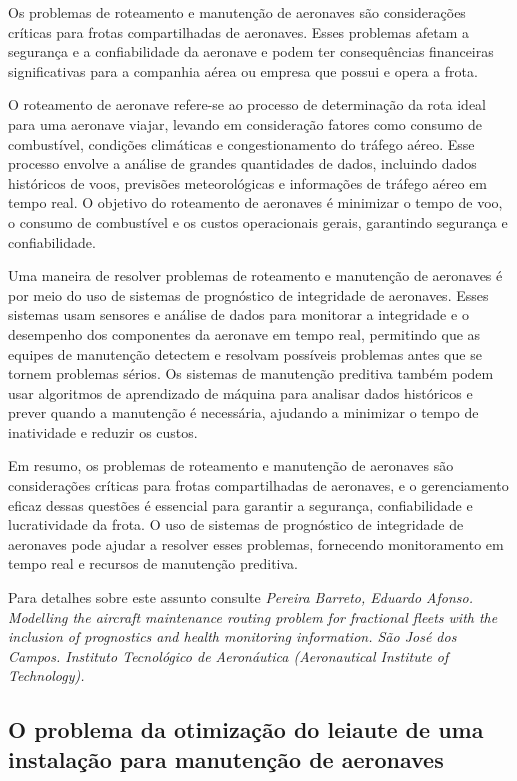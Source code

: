 \documentclass{article}
\begin{document}
Os problemas de roteamento e manutenção de aeronaves são considerações críticas para frotas compartilhadas de aeronaves. Esses problemas afetam a segurança e a confiabilidade da aeronave e podem ter consequências financeiras significativas para a companhia aérea ou empresa que possui e opera a frota.

O roteamento de aeronave refere-se ao processo de determinação da rota ideal para uma aeronave viajar, levando em consideração fatores como consumo de combustível, condições climáticas e congestionamento do tráfego aéreo. Esse processo envolve a análise de grandes quantidades de dados, incluindo dados históricos de voos, previsões meteorológicas e informações de tráfego aéreo em tempo real. O objetivo do roteamento de aeronaves é minimizar o tempo de voo, o consumo de combustível e os custos operacionais gerais, garantindo segurança e confiabilidade.

Uma maneira de resolver problemas de roteamento e manutenção de aeronaves é por meio do uso de sistemas de prognóstico de integridade de aeronaves. Esses sistemas usam sensores e análise de dados para monitorar a integridade e o desempenho dos componentes da aeronave em tempo real, permitindo que as equipes de manutenção detectem e resolvam possíveis problemas antes que se tornem problemas sérios. Os sistemas de manutenção preditiva também podem usar algoritmos de aprendizado de máquina para analisar dados históricos e prever quando a manutenção é necessária, ajudando a minimizar o tempo de inatividade e reduzir os custos.

Em resumo, os problemas de roteamento e manutenção de aeronaves são considerações críticas para frotas compartilhadas de aeronaves, e o gerenciamento eficaz dessas questões é essencial para garantir a segurança, confiabilidade e lucratividade da frota. O uso de sistemas de prognóstico de integridade de aeronaves pode ajudar a resolver esses problemas, fornecendo monitoramento em tempo real e recursos de manutenção preditiva.

Para detalhes sobre este assunto consulte {\it Pereira Barreto, Eduardo Afonso. Modelling the aircraft maintenance routing problem for fractional fleets with the inclusion of prognostics and health monitoring information. São José dos Campos. Instituto Tecnológico de Aeronáutica (Aeronautical Institute of Technology).}



\subsection{O problema da otimização do leiaute de uma instalação para manutenção de aeronaves}
\end{document}
